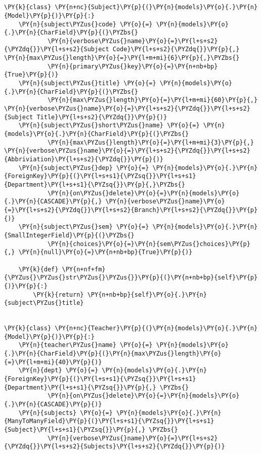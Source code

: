 \section*{}

\begin{Verbatim}[commandchars=\\\{\}]
 \PY{k}{class} \PY{n+nc}{Subject}\PY{p}{(}\PY{n}{models}\PY{o}{.}\PY{n}{Model}\PY{p}{)}\PY{p}{:}
    \PY{n}{subject\PYZus{}code} \PY{o}{=} \PY{n}{models}\PY{o}{.}\PY{n}{CharField}\PY{p}{(}\PYZbs{}
            \PY{n}{verbose\PYZus{}name}\PY{o}{=}\PY{l+s+s2}{\PYZdq{}}\PY{l+s+s2}{Subject Code}\PY{l+s+s2}{\PYZdq{}}\PY{p}{,} \PY{n}{max\PYZus{}length}\PY{o}{=}\PY{l+m+mi}{6}\PY{p}{,}\PYZbs{}
            \PY{n}{primary\PYZus{}key}\PY{o}{=}\PY{n+nb+bp}{True}\PY{p}{)}
    \PY{n}{subject\PYZus{}title} \PY{o}{=} \PY{n}{models}\PY{o}{.}\PY{n}{CharField}\PY{p}{(}\PYZbs{}
            \PY{n}{max\PYZus{}length}\PY{o}{=}\PY{l+m+mi}{60}\PY{p}{,} \PY{n}{verbose\PYZus{}name}\PY{o}{=}\PY{l+s+s2}{\PYZdq{}}\PY{l+s+s2}{Subject Title}\PY{l+s+s2}{\PYZdq{}}\PY{p}{)}
    \PY{n}{subject\PYZus{}short\PYZus{}name} \PY{o}{=} \PY{n}{models}\PY{o}{.}\PY{n}{CharField}\PY{p}{(}\PYZbs{}
            \PY{n}{max\PYZus{}length}\PY{o}{=}\PY{l+m+mi}{3}\PY{p}{,} \PY{n}{verbose\PYZus{}name}\PY{o}{=}\PY{l+s+s2}{\PYZdq{}}\PY{l+s+s2}{Abbriviation}\PY{l+s+s2}{\PYZdq{}}\PY{p}{)}
    \PY{n}{subject\PYZus{}dep} \PY{o}{=} \PY{n}{models}\PY{o}{.}\PY{n}{ForeignKey}\PY{p}{(}\PY{l+s+s1}{\PYZsq{}}\PY{l+s+s1}{Department}\PY{l+s+s1}{\PYZsq{}}\PY{p}{,}\PYZbs{}
            \PY{n}{on\PYZus{}delete}\PY{o}{=}\PY{n}{models}\PY{o}{.}\PY{n}{CASCADE}\PY{p}{,} \PY{n}{verbose\PYZus{}name}\PY{o}{=}\PY{l+s+s2}{\PYZdq{}}\PY{l+s+s2}{Branch}\PY{l+s+s2}{\PYZdq{}}\PY{p}{)}
    \PY{n}{subject\PYZus{}sem} \PY{o}{=} \PY{n}{models}\PY{o}{.}\PY{n}{SmallIntegerField}\PY{p}{(}\PYZbs{}
            \PY{n}{choices}\PY{o}{=}\PY{n}{sem\PYZus{}choices}\PY{p}{,} \PY{n}{null}\PY{o}{=}\PY{n+nb+bp}{True}\PY{p}{)}

    \PY{k}{def} \PY{n+nf+fm}{\PYZus{}\PYZus{}str\PYZus{}\PYZus{}}\PY{p}{(}\PY{n+nb+bp}{self}\PY{p}{)}\PY{p}{:}
        \PY{k}{return} \PY{n+nb+bp}{self}\PY{o}{.}\PY{n}{subject\PYZus{}title}


\PY{k}{class} \PY{n+nc}{Teacher}\PY{p}{(}\PY{n}{models}\PY{o}{.}\PY{n}{Model}\PY{p}{)}\PY{p}{:}
    \PY{n}{teacher\PYZus{}name} \PY{o}{=} \PY{n}{models}\PY{o}{.}\PY{n}{CharField}\PY{p}{(}\PY{n}{max\PYZus{}length}\PY{o}{=}\PY{l+m+mi}{40}\PY{p}{)}
    \PY{n}{dept} \PY{o}{=} \PY{n}{models}\PY{o}{.}\PY{n}{ForeignKey}\PY{p}{(}\PY{l+s+s1}{\PYZsq{}}\PY{l+s+s1}{Department}\PY{l+s+s1}{\PYZsq{}}\PY{p}{,} \PYZbs{}
            \PY{n}{on\PYZus{}delete}\PY{o}{=}\PY{n}{models}\PY{o}{.}\PY{n}{CASCADE}\PY{p}{)}
    \PY{n}{subjects} \PY{o}{=} \PY{n}{models}\PY{o}{.}\PY{n}{ManyToManyField}\PY{p}{(}\PY{l+s+s1}{\PYZsq{}}\PY{l+s+s1}{Subject}\PY{l+s+s1}{\PYZsq{}}\PY{p}{,} \PYZbs{}
            \PY{n}{verbose\PYZus{}name}\PY{o}{=}\PY{l+s+s2}{\PYZdq{}}\PY{l+s+s2}{Subjects}\PY{l+s+s2}{\PYZdq{}}\PY{p}{)}


\end{Verbatim}
